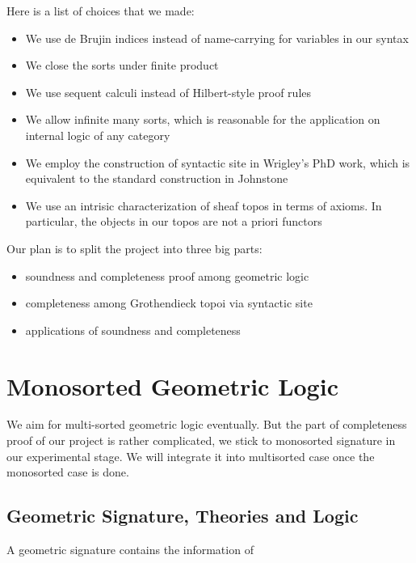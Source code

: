 Here is a list of choices that we made:
\begin{itemize}
  \item We use de Brujin indices instead of name-carrying for variables in our syntax
  \item We close the sorts under finite product
  \item We use sequent calculi instead of Hilbert-style proof rules
  \item We allow infinite many sorts, which is reasonable for the application on internal logic of any category
  \item We employ the construction of syntactic site in Wrigley's PhD work, which is equivalent to the standard construction
  in Johnstone
  \item We use an intrisic characterization of sheaf topos in terms of axioms. In particular, the objects in 
  our topos are not a priori functors

\end{itemize}


Our plan is to split the project into three big parts:
\begin{itemize}
  \item soundness and completeness proof among geometric logic 
  \item completeness among Grothendieck topoi via syntactic site
  \item applications of soundness and completeness
\end{itemize}

\chapter{Monosorted Geometric Logic}
We aim for multi-sorted geometric logic eventually. But the part of completeness proof of our project is rather complicated, we stick to 
monosorted signature in our experimental stage. We will integrate it into multisorted case once the monosorted case is done.

\section{Geometric Signature, Theories and Logic}

\begin{definition}
A geometric signature contains the information of 
\end{definition}


